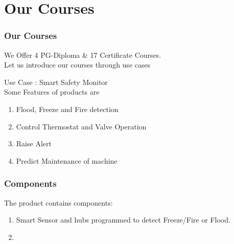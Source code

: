 \section{Our Courses}


\begin{frame}
\frametitle{Our Courses}

We Offer 4 PG-Diploma \&
17 Certificate Courses.  \\ \vspace{1cm}
Let us introduce our courses through use cases

{\centering Use Case :  {\Large  Smart Safety Monitor \\ }}
\vspace{1cm}
Some Features of products are
\begin{enumerate}
\item Flood, Freeze and Fire detection
\item Control Thermostat and Valve Operation
\item Raise Alert
\item Predict Maintenance of machine 
\end{enumerate}
\end{frame}

\begin{frame}
	\frametitle{Components}
	The product contains components:
	\begin{enumerate}
		\item<1-> Smart Sensor and hubs programmed to detect Freeze/Fire or Flood.
		\item
		
	\end{enumerate}
\end{frame}